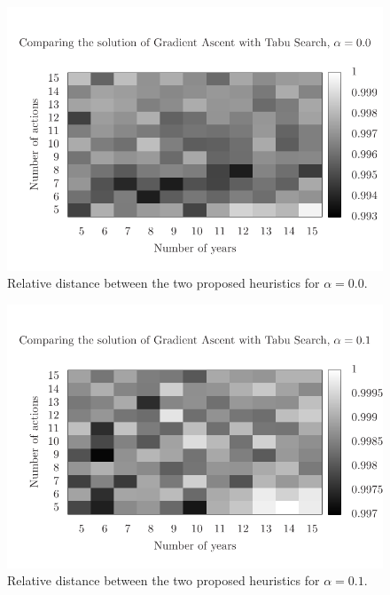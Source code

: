 \begin{figure}
\centering
\includegraphics[scale=0.5, trim=0.75cm 0cm 0 2cm, clip=true]{imgs/comp_very_hard_sg_ts.pdf}
\caption{Relative distance between the two proposed heuristics for $\alpha=0.0$.}
\label{fig:comp_1}
\end{figure}


\begin{figure}
\centering
\includegraphics[scale=0.5, trim=0.75cm 0cm 0 2cm, clip=true]{imgs/comp_hard_sg_ts.pdf}
\caption{Relative distance between the two proposed heuristics for $\alpha=0.1$.}
\label{fig:comp_2}
\end{figure}

